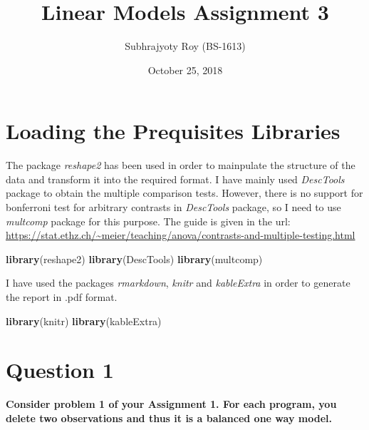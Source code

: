 \documentclass[]{article}
\title{Linear Models Assignment 3}
\author{Subhrajyoty Roy (BS-1613)}
\date{October 25, 2018}
\newenvironment{Shaded}{\begin{snugshade}}{\end{snugshade}}
\newcommand{\KeywordTok}[1]{\textcolor[rgb]{0.13,0.29,0.53}{\textbf{#1}}}
\newcommand{\NormalTok}[1]{#1}
\begin{document}
\maketitle

\section{Loading the Prequisites
Libraries}\label{loading-the-prequisites-libraries}

The package \emph{reshape2} has been used in order to mainpulate the
structure of the data and transform it into the required format. I have
mainly used \emph{DescTools} package to obtain the multiple comparison
tests. However, there is no support for bonferroni test for arbitrary
contrasts in \emph{DescTools} package, so I need to use \emph{multcomp}
package for this purpose. The guide is given in the url:
\url{https://stat.ethz.ch/~meier/teaching/anova/contrasts-and-multiple-testing.html}

\begin{Shaded}
\begin{Highlighting}[]
\KeywordTok{library}\NormalTok{(reshape2)}
\KeywordTok{library}\NormalTok{(DescTools)}
\KeywordTok{library}\NormalTok{(multcomp)}
\end{Highlighting}
\end{Shaded}

I have used the packages \emph{rmarkdown}, \emph{knitr} and
\emph{kableExtra} in order to generate the report in .pdf format.

\begin{Shaded}
\begin{Highlighting}[]
\KeywordTok{library}\NormalTok{(knitr)}
\KeywordTok{library}\NormalTok{(kableExtra)}
\end{Highlighting}
\end{Shaded}

\section{Question 1}\label{question-1}

\textbf{Consider problem 1 of your Assignment 1. For each program, you
delete two observations and thus it is a balanced one way model.}
\end{document}
